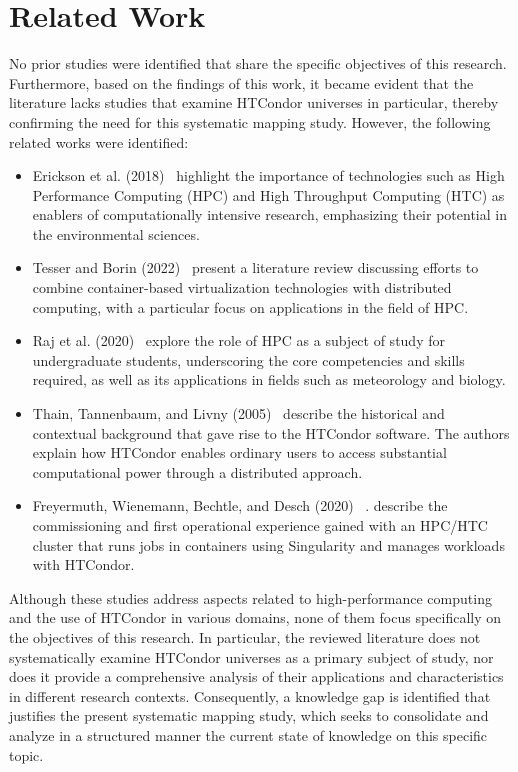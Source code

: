 \section{Related Work}\label{sec:trabajos-relacionados}
No prior studies were identified that share the specific objectives of this research. Furthermore, based on the findings of this work, it became evident that the literature lacks studies that examine HTCondor universes in particular, thereby confirming the need for this systematic mapping study.
However, the following related works were identified:
\begin{itemize}[label=\textbf{--}]
	\item Erickson et al. (2018)~\cite{EricksonA-01} highlight the importance of technologies such as High Performance Computing (HPC) and High Throughput Computing (HTC) as enablers of computationally intensive research, emphasizing their potential in the environmental sciences.
	\item Tesser and Borin (2022)~\cite{KellerTesser2023} present a literature review discussing efforts to combine container-based virtualization technologies with distributed computing, with a particular focus on applications in the field of HPC.
	\item Raj et al. (2020)~\cite{RajRomanowski2020} explore the role of HPC as a subject of study for undergraduate students, underscoring the core competencies and skills required, as well as its applications in fields such as meteorology and biology.
	\item Thain, Tannenbaum, and Livny (2005)~\cite{Livny-Tannenbaum2005} describe the historical and contextual background that gave rise to the HTCondor software. The authors explain how HTCondor enables ordinary users to access substantial computational power through a distributed approach.
	\item Freyermuth, Wienemann, Bechtle, and Desch (2020) ~\cite{Freyermuth2021a}. describe the commissioning and first operational experience gained with an HPC/HTC cluster that runs jobs in containers using Singularity and manages workloads with HTCondor.
\end{itemize}

Although these studies address aspects related to high-performance computing and the use of HTCondor in various domains, none of them focus specifically on the objectives of this research. In particular, the reviewed literature does not systematically examine HTCondor universes as a primary subject of study, nor does it provide a comprehensive analysis of their applications and characteristics in different research contexts. Consequently, a knowledge gap is identified that justifies the present systematic mapping study, which seeks to consolidate and analyze in a structured manner the current state of knowledge on this specific topic.



